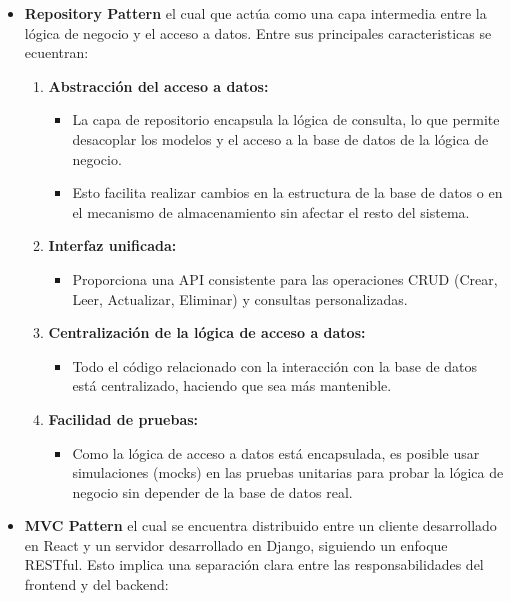 \documentclass{report}
\begin{document}
    \begin{itemize}
        \item \textbf{Repository Pattern} el cual que actúa como una capa intermedia entre la lógica de negocio y el acceso a datos. Entre sus principales caracteristicas se ecuentran:
        \begin{enumerate}
            \item \textbf{Abstracción del acceso a datos:}
            \begin{itemize}
                \item La capa de repositorio encapsula la lógica de consulta, lo que permite desacoplar los modelos y el acceso a la base de datos de la lógica de negocio.
                \item Esto facilita realizar cambios en la estructura de la base de datos o en el mecanismo de almacenamiento sin afectar el resto del sistema.
            \end{itemize}

            \item \textbf{Interfaz unificada:}
            \begin{itemize}
                \item Proporciona una API consistente para las operaciones CRUD (Crear, Leer, Actualizar, Eliminar) y consultas personalizadas.
            \end{itemize}

            \item \textbf{Centralización de la lógica de acceso a datos:}
            \begin{itemize}
                \item Todo el código relacionado con la interacción con la base de datos está centralizado, haciendo que sea más mantenible.
            \end{itemize}

            \item \textbf{Facilidad de pruebas:}
            \begin{itemize}
                \item Como la lógica de acceso a datos está encapsulada, es posible usar simulaciones (mocks) en las pruebas unitarias para probar la lógica de negocio sin depender de la base de datos real.
            \end{itemize}
        \end{enumerate}

        \item \textbf{MVC Pattern} el cual se encuentra distribuido entre un cliente desarrollado en React y un servidor desarrollado en Django, siguiendo un enfoque RESTful. Esto implica una separación clara entre las responsabilidades del frontend y del backend:


\end{itemize}
\end{document}
